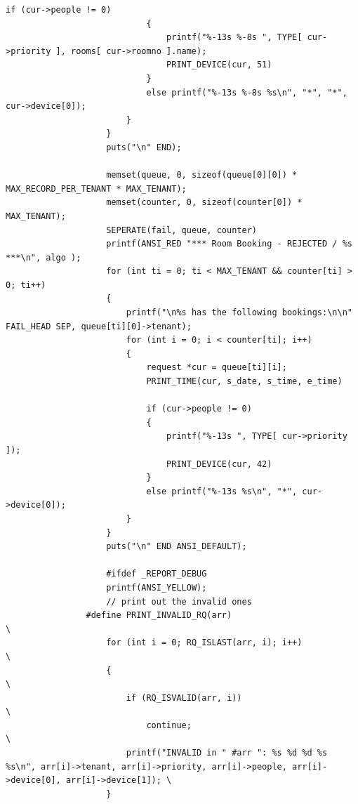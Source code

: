 \documentclass{article}
\begin{document}
\begin{Verbatim}[gobble=8]
                            if (cur->people != 0)
                            {
                                printf("%-13s %-8s ", TYPE[ cur->priority ], rooms[ cur->roomno ].name);
                                PRINT_DEVICE(cur, 51)
                            }
                            else printf("%-13s %-8s %s\n", "*", "*", cur->device[0]);
                        }
                    }
                    puts("\n" END);
                
                    memset(queue, 0, sizeof(queue[0][0]) * MAX_RECORD_PER_TENANT * MAX_TENANT);
                    memset(counter, 0, sizeof(counter[0]) * MAX_TENANT);
                    SEPERATE(fail, queue, counter)
                    printf(ANSI_RED "*** Room Booking - REJECTED / %s ***\n", algo );
                    for (int ti = 0; ti < MAX_TENANT && counter[ti] > 0; ti++)
                    {
                        printf("\n%s has the following bookings:\n\n" FAIL_HEAD SEP, queue[ti][0]->tenant);
                        for (int i = 0; i < counter[ti]; i++)
                        {
                            request *cur = queue[ti][i];
                            PRINT_TIME(cur, s_date, s_time, e_time)
                
                            if (cur->people != 0)
                            {
                                printf("%-13s ", TYPE[ cur->priority ]);
                                PRINT_DEVICE(cur, 42)
                            }
                            else printf("%-13s %s\n", "*", cur->device[0]);
                        }
                    }
                    puts("\n" END ANSI_DEFAULT);
                
                    #ifdef _REPORT_DEBUG
                    printf(ANSI_YELLOW);
                    // print out the invalid ones
                #define PRINT_INVALID_RQ(arr)                                                                                                                   \
                    for (int i = 0; RQ_ISLAST(arr, i); i++)                                                                                                     \
                    {                                                                                                                                           \
                        if (RQ_ISVALID(arr, i))                                                                                                                 \
                            continue;                                                                                                                           \
                        printf("INVALID in " #arr ": %s %d %d %s %s\n", arr[i]->tenant, arr[i]->priority, arr[i]->people, arr[i]->device[0], arr[i]->device[1]); \
                    }
                

\end{Verbatim}
\end{document}
